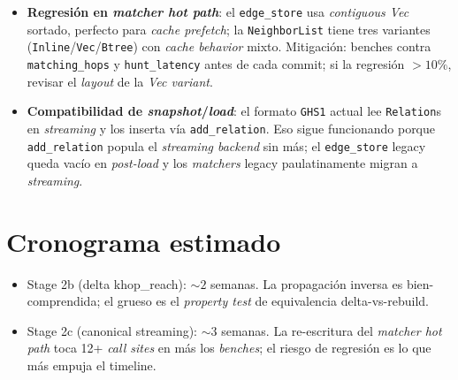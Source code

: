 \begin{itemize}
    \item \textbf{Regresión en \emph{matcher hot path}}: el
    \texttt{edge\_store} usa \emph{contiguous Vec} sortado, perfecto
    para \emph{cache prefetch}; la \texttt{NeighborList} tiene tres
    variantes (\texttt{Inline}/\texttt{Vec}/\texttt{Btree}) con \emph{cache
    behavior} mixto. Mitigación: benches contra \texttt{matching\_hops}
    y \texttt{hunt\_latency} antes de cada commit; si la regresión
    \(> 10\%\), revisar el \emph{layout} de la \emph{Vec variant}.
    \item \textbf{Compatibilidad de \emph{snapshot}/\emph{load}}: el
    formato \texttt{GHS1} actual lee \texttt{Relation}s en
    \emph{streaming} y los inserta vía \texttt{add\_relation}. Eso
    sigue funcionando porque \texttt{add\_relation} popula el
    \emph{streaming backend} sin más; el \texttt{edge\_store} legacy
    queda vacío en \emph{post-load} y los \emph{matchers} legacy
    paulatinamente migran a \emph{streaming}.
\end{itemize}

\section{Cronograma estimado}

\begin{itemize}
    \item Stage 2b (delta khop\_reach): \(\sim 2\) semanas. La
    propagación inversa es bien-comprendida; el grueso es el
    \emph{property test} de equivalencia delta-vs-rebuild.
    \item Stage 2c (canonical streaming): \(\sim 3\) semanas. La
    re-escritura del \emph{matcher hot path} toca 12+ \emph{call
    sites} en  más los
    \emph{benches}; el riesgo de regresión es lo que más empuja el
    timeline.
\end{itemize}
